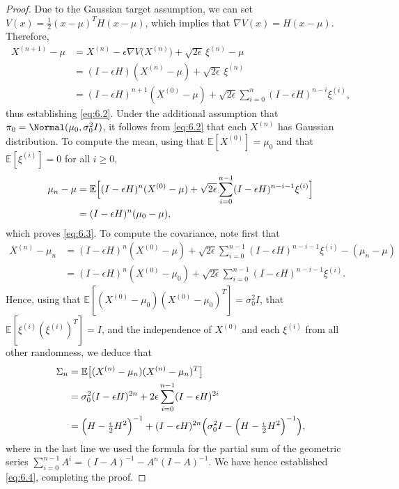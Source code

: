 \begin{proof}
Due to the Gaussian target assumption, we can set $V(x) = \frac{1}{2}(x-\mu)^T H(x-\mu)$,
which implies that $\nabla V(x) = H(x-\mu)$. Therefore,
\begin{align*}
  X^{(n+1)} - \mu
  &= X^{(n)} - \epsilon\nabla V\!\bigl(X^{(n)}\bigr) + \sqrt{2\epsilon}\,\xi^{(n)} - \mu \\
  &= (I - \epsilon H)(X^{(n)} - \mu) + \sqrt{2\epsilon}\,\xi^{(n)} \\
  &= (I - \epsilon H)^{n+1}(X^{(0)} - \mu) + \sqrt{2\epsilon}\sum_{i=0}^{n}(I-\epsilon H)^{n-i}\xi^{(i)},
\end{align*}
thus establishing \eqref{eq:6.2}. Under the additional assumption that
$\pi_0 = \Normal(\mu_0, \sigma_0^2 I)$, it follows from \eqref{eq:6.2} that each $X^{(n)}$
has Gaussian distribution. To compute the mean, using that $\mathbb{E}[X^{(0)}] = \mu_0$ and
that $\mathbb{E}[\xi^{(i)}] = 0$ for all $i \ge 0$,
\begin{align*}
  \mu_n - \mu
  &= \mathbb{E}\Bigl[(I-\epsilon H)^n(X^{(0)}-\mu)
    + \sqrt{2\epsilon}\sum_{i=0}^{n-1}(I-\epsilon H)^{n-i-1}\xi^{(i)}\Bigr] \\
  &= (I - \epsilon H)^n(\mu_0 - \mu),
\end{align*}
which proves \eqref{eq:6.3}. To compute the covariance, note first that
\begin{align*}
  X^{(n)} - \mu_n
  &= (I-\epsilon H)^n(X^{(0)}-\mu) + \sqrt{2\epsilon}\sum_{i=0}^{n-1}(I-\epsilon H)^{n-i-1}\xi^{(i)}
    - (\mu_n - \mu) \\
  &= (I-\epsilon H)^n(X^{(0)}-\mu_0) + \sqrt{2\epsilon}\sum_{i=0}^{n-1}(I-\epsilon H)^{n-i-1}\xi^{(i)}.
\end{align*}
Hence, using that $\mathbb{E}[(X^{(0)}-\mu_0)(X^{(0)}-\mu_0)^T] = \sigma_0^2 I$, that
$\mathbb{E}[\xi^{(i)}(\xi^{(i)})^T] = I$, and the independence of $X^{(0)}$ and each
$\xi^{(i)}$ from all other randomness, we deduce that
\begin{align*}
  \Sigma_n
  &= \mathbb{E}\bigl[(X^{(n)}-\mu_n)(X^{(n)}-\mu_n)^T\bigr] \\
  &= \sigma_0^2(I-\epsilon H)^{2n}
    + 2\epsilon\sum_{i=0}^{n-1}(I-\epsilon H)^{2i} \\
  &= \Bigl(H - \tfrac{\epsilon}{2}H^2\Bigr)^{-1}
    + (I-\epsilon H)^{2n}\Bigl(\sigma_0^2 I - \Bigl(H-\tfrac{\epsilon}{2}H^2\Bigr)^{-1}\Bigr),
\end{align*}
where in the last line we used the formula for the partial sum of the geometric series
$\sum_{i=0}^{n-1} A^i = (I-A)^{-1} - A^n(I-A)^{-1}$. We have hence established \eqref{eq:6.4},
completing the proof.
\end{proof}

